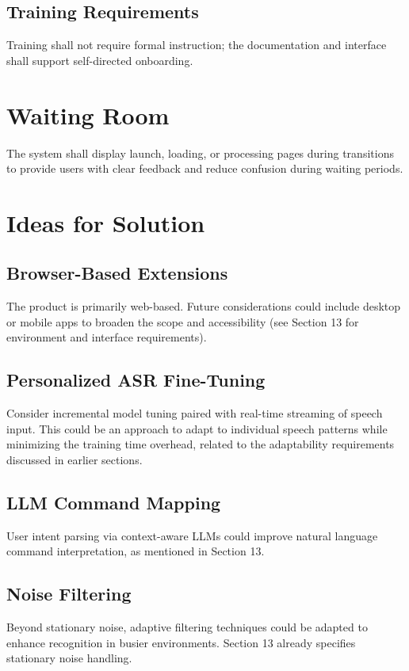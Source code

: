 \documentclass[12pt]{article}
\begin{document}
\subsection{Training Requirements}
Training shall not require formal instruction; the documentation and interface shall support self-directed onboarding.

\section{Waiting Room}
The system shall display launch, loading, or processing pages during transitions to provide users with clear feedback and reduce confusion during waiting periods.

\section{Ideas for Solution}

\subsection{Browser-Based Extensions}
The product is primarily web-based. Future considerations could include desktop or mobile apps to broaden the scope and accessibility (see Section 13 for environment and interface requirements).

\subsection{Personalized ASR Fine-Tuning}
Consider incremental model tuning paired with real-time streaming of speech input. This could be an approach to adapt to individual speech patterns while minimizing the training time overhead, related to the adaptability requirements discussed in earlier sections.

\subsection{LLM Command Mapping}
User intent parsing via context-aware LLMs could improve natural language command interpretation, as mentioned in Section 13.

\subsection{Noise Filtering}
Beyond stationary noise, adaptive filtering techniques could be adapted to enhance recognition in busier environments. Section 13 already specifies stationary noise handling.
\end{document}
